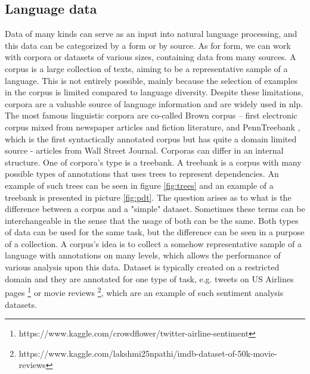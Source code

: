 \subsection{Language data}
Data of many kinds can serve as an input into natural language processing, and this data can be categorized by a form or by source.
As for form, we can work with corpora or datasets of various sizes, containing data from many sources. A corpus is a large collection of texts, aiming to be a representative sample of a language. This is not entirely possible, mainly because the selection of examples in the corpus is limited compared to language diversity. Despite these limitations, corpora are a valuable source of language information and are widely used in \acrshort{nlp}. The most famous linguistic corpora are co-called Brown corpus \citep{francis79browncorpus} -- first electronic corpus mixed from newspaper articles and fiction literature, and PennTreebank \citep{Marcus1993}, which is the first syntactically annotated corpus but has quite a domain limited source - articles from Wall Street Journal. Corporas can differ in an internal structure. One of corpora's type is a treebank. A treebank is a corpus with many possible types of annotations that uses trees to represent dependencies. An example of such trees can be seen in figure \ref{fig:trees} and an example of a treebank is presented in picture \ref{fig:pdt}.
The question arises as to what is the difference between a corpus and a "simple" dataset. Sometimes these terms can be interchangeable in the sense that the usage of both can be the same. Both types of data can be used for the same task, but the difference can be seen in a purpose of a collection. A corpus's idea is to collect a somehow representative sample of a language with annotations on many levels, which allows the performance of various analysis upon this data. Dataset is typically created on a restricted domain and they are annotated for one type of task, e.g. tweets on US Airlines pages \footnote{https://www.kaggle.com/crowdflower/twitter-airline-sentiment} or movie reviews \footnote{https://www.kaggle.com/lakshmi25npathi/imdb-dataset-of-50k-movie-reviews}, which are an example of such sentiment analysis datasets.
